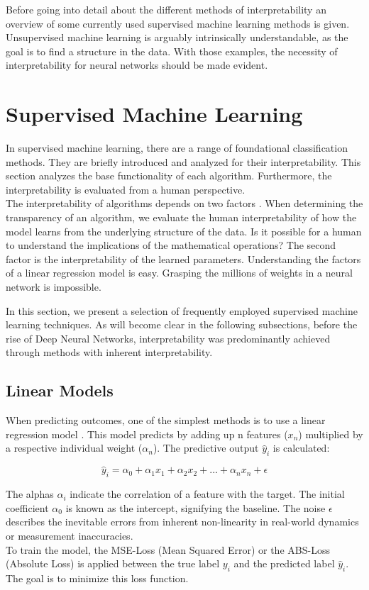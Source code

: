 Before going into detail about the different methods of interpretability an overview of some currently used supervised machine learning methods is given. Unsupervised machine learning is arguably intrinsically understandable, as the goal is to find a structure in the data. \cite{allen2023interpretable} With those examples, the necessity of interpretability for neural networks should be made evident.

\section{Supervised Machine Learning}

In supervised machine learning, there are a range of foundational classification methods. They are briefly introduced and analyzed for their interpretability. This section analyzes the base functionality of each algorithm. Furthermore, the interpretability is evaluated from a human perspective.
\\
The interpretability of algorithms depends on two factors \cite{molnar2022}. When determining the transparency of an algorithm, we evaluate the human interpretability of how the model learns from the underlying structure of the data. Is it possible for a human to understand the implications of the mathematical operations? The second factor is the interpretability of the learned parameters. Understanding the factors of a linear regression model is easy. Grasping the millions of weights in a neural network is impossible.

In this section, we present a selection of frequently employed supervised machine learning techniques. As will become clear in the following subsections, before the rise of Deep Neural Networks, interpretability was predominantly achieved through methods with inherent interpretability.

\subsection{Linear Models}

When predicting outcomes, one of the simplest methods is to use a linear regression model \cite{puntanen2013methods}. This model predicts by adding up n features ($x_n$) multiplied by a respective individual weight ($\alpha_n$). The predictive output $\hat{y}_i$ is calculated:

$$ \hat{y}_i= \alpha_0 + \alpha_1 x_1 + \alpha_2 x_2 +... +\alpha_n x_{n} + \epsilon$$

The alphas $\alpha_i$ indicate the correlation of a feature with the target. The initial coefficient $\alpha_0$ is known as the intercept, signifying the baseline. The noise $\epsilon$ describes the inevitable errors from inherent non-linearity in real-world dynamics or measurement inaccuracies.
\\
To train the model, the MSE-Loss (Mean Squared Error) or the ABS-Loss (Absolute Loss) is applied between the true label $y_i$ and the predicted label $\hat{y}_i$. The goal is to minimize this loss function. 

